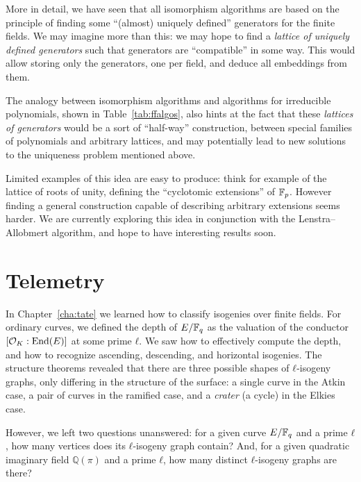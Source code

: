 \documentclass{report}
\theoremstyle{plain}
\theoremstyle{definition}
\begin{document}
More in detail, we have seen that all isomorphism algorithms are based
on the principle of finding some ``(almost) uniquely defined''
generators for the finite fields. %
We may imagine more than this: we may hope to find a \emph{lattice of
  uniquely defined generators} such that generators are ``compatible''
in some way. %
This would allow storing only the generators, one per field, and
deduce all embeddings from them. %

The analogy between isomorphism algorithms and algorithms for
irreducible polynomials, shown in Table~\ref{tab:ffalgos}, also hints
at the fact that these \emph{lattices of generators} would be a sort
of ``half-way'' construction, between special families of polynomials
and arbitrary lattices, and may potentially lead to new solutions to
the uniqueness problem mentioned above.

Limited examples of this idea are easy to produce: think for example
of the lattice of roots of unity, defining the ``cyclotomic
extensions'' of $\mathbb{F}_p$. %
However finding a general construction capable of describing arbitrary
extensions seems harder. %
We are currently exploring this idea in conjunction with the
Lenstra--Allobmert algorithm, and hope to have interesting results
soon. %



\chapter{Telemetry}
\label{cha:crypto}

In Chapter~\ref{cha:tate} we learned how to classify isogenies over
finite fields. %
For ordinary curves, we defined the depth of $E/\mathbb{F}_q$ as the valuation
of the conductor $[\mathcal{O}_K:\operatorname{End}(E)]$ at some prime $ℓ$. %
We saw how to effectively compute the depth, and how to recognize
ascending, descending, and horizontal isogenies. %
The structure theorems revealed that there are three possible shapes
of $ℓ$-isogeny graphs, only differing in the structure of the surface:
a single curve in the Atkin case, a pair of curves in the ramified
case, and a \emph{crater} (a cycle) in the Elkies case. %

However, we left two questions unanswered: for a given curve $E/\mathbb{F}_q$
and a prime $ℓ$, how many vertices does its $ℓ$-isogeny graph
contain? %
And, for a given quadratic imaginary field $ℚ(π)$ and a prime $ℓ$, how
many distinct $ℓ$-isogeny graphs are there?
\end{document}
